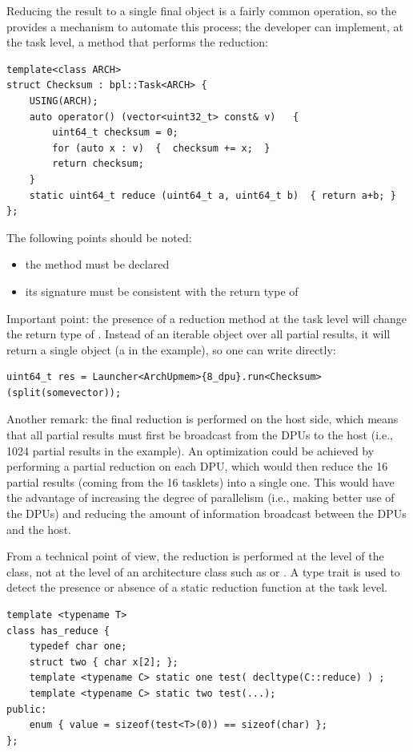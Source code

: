 Reducing the result to a single final object is a fairly common operation, so the \BPL provides a mechanism to automate this process; 
the developer can implement, at the task level, a  method that performs the reduction:
\begin{verbatim}
template<class ARCH>
struct Checksum : bpl::Task<ARCH> {
    USING(ARCH);
    auto operator() (vector<uint32_t> const& v)   {
        uint64_t checksum = 0;
        for (auto x : v)  {  checksum += x;  }
        return checksum;
    }
    static uint64_t reduce (uint64_t a, uint64_t b)  { return a+b; }
};
\end{verbatim}
The following points should be noted:
\begin{itemize}
	\item the  method must be declared 
	\item its signature must be consistent with the return type of 
\end{itemize}

Important point: the presence of a reduction method at the task level will change the return type of . 
Instead of an iterable object over all partial results, it will return a single object (a  in the example), 
so one can write directly:
\begin{verbatim}
uint64_t res = Launcher<ArchUpmem>{8_dpu}.run<Checksum>(split(somevector));
\end{verbatim}

Another remark: the final reduction is performed on the host side, which means that all partial results must first be broadcast 
from the DPUs to the host (i.e., 1024 partial results in the  example). 
An optimization could be achieved by performing a partial reduction on each DPU, which would then reduce the 16 partial results 
(coming from the 16 tasklets) into a single one. 
This would have the advantage of increasing the degree of parallelism (i.e., making better use of the DPUs) 
and reducing the amount of information broadcast between the DPUs and the host.

From a technical point of view, the reduction is performed at the level of the  class, not at the level of an architecture
 class such as  or . A type trait  is used to detect the presence or absence of a static
  reduction function at the task level.
\begin{verbatim}
template <typename T>
class has_reduce {
    typedef char one;
    struct two { char x[2]; };
    template <typename C> static one test( decltype(C::reduce) ) ;
    template <typename C> static two test(...);
public:
    enum { value = sizeof(test<T>(0)) == sizeof(char) };
};
\end{verbatim}

